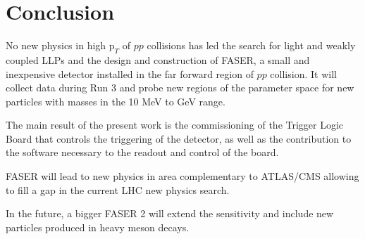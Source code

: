 \chapter{Conclusion}

\ifpdf
    \graphicspath{{Conclusion/Figs/Raster/}{Conclusion/Figs/PDF/}{Conclusion/Figs/}}
\else
    \graphicspath{{Conclusion/Figs/Vector/}{Conclusion/Figs/}}
\fi

No new physics in high $\text{p}_{T}$ of $pp$ collisions has led the search for light and weakly coupled LLPs and the design and construction of FASER, a small and inexpensive detector installed in the far forward region of $pp$ collision. It will collect data during Run 3 and probe new regions of the parameter space for new particles with masses in the 10 MeV to GeV range.

The main result of the present work is the commissioning of the Trigger Logic Board that controls the triggering of the detector, as well as the contribution to the software necessary to the readout and control of the board.

FASER will lead to new physics in area complementary to ATLAS/CMS allowing to fill a gap in the current LHC new physics search.

In the future, a bigger FASER 2 will extend the sensitivity and include new particles produced in heavy meson decays.